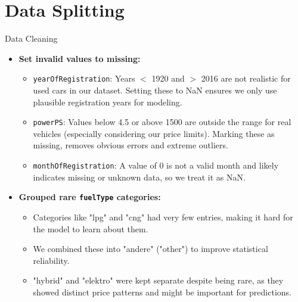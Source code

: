 \documentclass{beamer}
\begin{document}
\section{Data Splitting}
\begin{frame}{Data Cleaning}
        \begin{itemize}
                \item \textbf{Set invalid values to missing:}
                        \begin{itemize}
                                \item \texttt{yearOfRegistration}: Years $<$
                                        1920 and $>$ 2016 are not realistic for
                                        used cars in our dataset. Setting these
                                        to NaN ensures we only use plausible
                                        registration years for modeling.
                                \item \texttt{powerPS}: Values below 4.5 or
                                        above 1500 are outside the range for
                                        real vehicles (especially considering
                                        our price limits). Marking these as
                                        missing, removes obvious errors and
                                        extreme outliers.
                                \item \texttt{monthOfRegistration}: A value of
                                        0 is not a valid month and likely
                                        indicates missing or unknown data, so
                                        we treat it as NaN.
                        \end{itemize}
                \item \textbf{Grouped rare \texttt{fuelType} categories:}
                        \begin{itemize}
                                \item Categories like "lpg" and "cng" had very
                                        few entries, making it hard for the
                                        model to learn about them.
                                \item We combined these into "andere" ("other")
                                        to improve statistical reliability.
                                \item "hybrid" and "elektro" were kept separate
                                        despite being rare, as they showed
                                        distinct price patterns and might be
                                        important for predictions.
                        \end{itemize}
        \end{itemize}
\end{frame}
\end{document}
